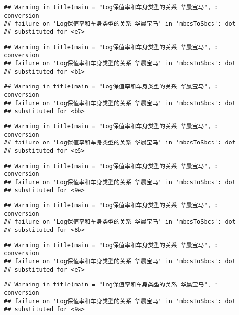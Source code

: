 \documentclass[]{article}
\begin{document}
\begin{verbatim}
## Warning in title(main = "Log保值率和车身类型的关系 华晨宝马", : conversion
## failure on 'Log保值率和车身类型的关系 华晨宝马' in 'mbcsToSbcs': dot
## substituted for <e7>
\end{verbatim}

\begin{verbatim}
## Warning in title(main = "Log保值率和车身类型的关系 华晨宝马", : conversion
## failure on 'Log保值率和车身类型的关系 华晨宝马' in 'mbcsToSbcs': dot
## substituted for <b1>
\end{verbatim}

\begin{verbatim}
## Warning in title(main = "Log保值率和车身类型的关系 华晨宝马", : conversion
## failure on 'Log保值率和车身类型的关系 华晨宝马' in 'mbcsToSbcs': dot
## substituted for <bb>
\end{verbatim}

\begin{verbatim}
## Warning in title(main = "Log保值率和车身类型的关系 华晨宝马", : conversion
## failure on 'Log保值率和车身类型的关系 华晨宝马' in 'mbcsToSbcs': dot
## substituted for <e5>
\end{verbatim}

\begin{verbatim}
## Warning in title(main = "Log保值率和车身类型的关系 华晨宝马", : conversion
## failure on 'Log保值率和车身类型的关系 华晨宝马' in 'mbcsToSbcs': dot
## substituted for <9e>
\end{verbatim}

\begin{verbatim}
## Warning in title(main = "Log保值率和车身类型的关系 华晨宝马", : conversion
## failure on 'Log保值率和车身类型的关系 华晨宝马' in 'mbcsToSbcs': dot
## substituted for <8b>
\end{verbatim}

\begin{verbatim}
## Warning in title(main = "Log保值率和车身类型的关系 华晨宝马", : conversion
## failure on 'Log保值率和车身类型的关系 华晨宝马' in 'mbcsToSbcs': dot
## substituted for <e7>
\end{verbatim}

\begin{verbatim}
## Warning in title(main = "Log保值率和车身类型的关系 华晨宝马", : conversion
## failure on 'Log保值率和车身类型的关系 华晨宝马' in 'mbcsToSbcs': dot
## substituted for <9a>
\end{verbatim}
\end{document}
